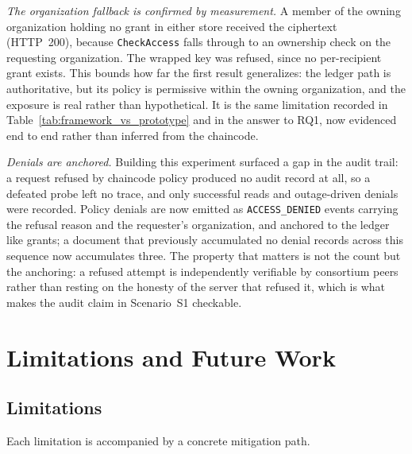 \documentclass[preprint,12pt]{elsarticle}
\begin{document}
\emph{The organization fallback is confirmed by measurement.} A member of the owning
organization holding no grant in either store received the ciphertext (HTTP~200),
because \texttt{CheckAccess} falls through to an ownership check on the requesting
organization. The wrapped key was refused, since no per-recipient grant exists. This
bounds how far the first result generalizes: the ledger path is authoritative, but
its policy is permissive within the owning organization, and the exposure is real
rather than hypothetical. It is the same limitation recorded in
Table~\ref{tab:framework_vs_prototype} and in the answer to RQ1, now evidenced
end to end rather than inferred from the chaincode.

\emph{Denials are anchored.} Building this experiment surfaced a gap in the audit
trail: a request refused by chaincode policy produced no audit record at all, so a
defeated probe left no trace, and only successful reads and outage-driven denials
were recorded. Policy denials are now emitted as \texttt{ACCESS\_DENIED} events
carrying the refusal reason and the requester's organization, and anchored to the
ledger like grants; a document that previously accumulated no denial records across
this sequence now accumulates three. The property that matters is not the count but
the anchoring: a refused attempt is independently verifiable by consortium peers
rather than resting on the honesty of the server that refused it, which is what makes
the audit claim in Scenario~S1 checkable.

\section{Limitations and Future Work}
\label{sec:limitations}

\subsection{Limitations}
\label{sec:limitations_detail}

Each limitation is accompanied by a concrete mitigation path.
\end{document}
